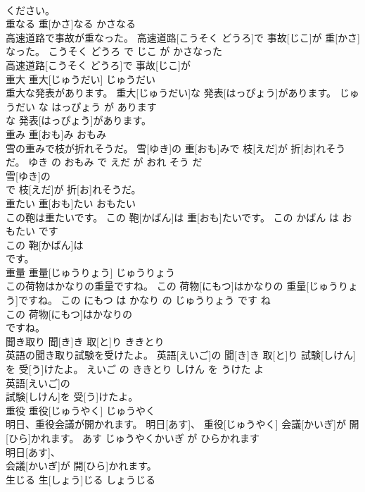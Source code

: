 \documentclass[8pt]{extreport}
\begin{document}
\begin{CJK}{UTF8}{min}
\\	ください。			
\\	重なる	重[かさ]なる	かさなる	
\\	高速道路で事故が重なった。	高速道路[こうそく どうろ]で 事故[じこ]が 重[かさ]なった。	こうそく どうろ で じこ が かさなった	
\\	高速道路[こうそく どうろ]で 事故[じこ]が
\\	重大	重大[じゅうだい]	じゅうだい	
\\	重大な発表があります。	重大[じゅうだい]な 発表[はっぴょう]があります。	じゅうだい な はっぴょう が あります	
\\	な 発表[はっぴょう]があります。			
\\	重み	重[おも]み	おもみ	
\\	雪の重みで枝が折れそうだ。	雪[ゆき]の 重[おも]みで 枝[えだ]が 折[お]れそうだ。	ゆき の おもみ で えだ が おれ そう だ	
\\	雪[ゆき]の
\\	で 枝[えだ]が 折[お]れそうだ。			
\\	重たい	重[おも]たい	おもたい	
\\	この鞄は重たいです。	この 鞄[かばん]は 重[おも]たいです。	この かばん は おもたい です	
\\	この 鞄[かばん]は
\\	です。			
\\	重量	重量[じゅうりょう]	じゅうりょう	
\\	この荷物はかなりの重量ですね。	この 荷物[にもつ]はかなりの 重量[じゅうりょう]ですね。	この にもつ は かなり の じゅうりょう です ね	
\\	この 荷物[にもつ]はかなりの
\\	ですね。			
\\	聞き取り	聞[き]き 取[と]り	ききとり	
\\	英語の聞き取り試験を受けたよ。	英語[えいご]の 聞[き]き 取[と]り 試験[しけん]を 受[う]けたよ。	えいご の ききとり しけん を うけた よ	
\\	英語[えいご]の
\\	試験[しけん]を 受[う]けたよ。			
\\	重役	重役[じゅうやく]	じゅうやく	
\\	明日、重役会議が開かれます。	明日[あす]、 重役[じゅうやく] 会議[かいぎ]が 開[ひら]かれます。	あす じゅうやくかいぎ が ひらかれます	
\\	明日[あす]、
\\	会議[かいぎ]が 開[ひら]かれます。			
\\	生じる	生[しょう]じる	しょうじる	

\end{CJK}
\end{document}
